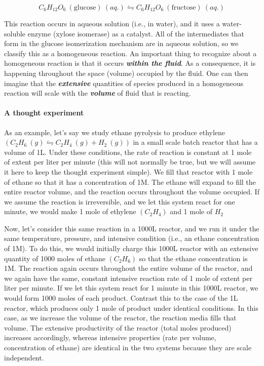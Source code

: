 \documentclass[11pt]{article}
\begin{document}
\[C_6H_{12}O_6 \ (\textrm{glucose}) \ (aq.) \leftrightharpoons C_6H_{12}O_6 \ (\textrm{fructose}) \ (aq.)\]

This reaction occurs in aqueous solution (i.e., in water), and it uses a
water-soluble enzyme (xylose isomerase) as a catalyst. All of the
intermediates that form in the glucose isomerization mechanism are in
aqueous solution, so we classify this as a homogeneous reaction. An
important thing to recognize about a homogeneous reaction is that it
occurs \textbf{\emph{within the fluid}}. As a consequence, it is
happening throughout the space (volume) occupied by the fluid. One can
then imagine that the \textbf{\emph{extensive}} quantities of species
produced in a homogeneous reaction will scale with the
\textbf{\emph{volume}} of fluid that is reacting.

\hypertarget{a-thought-experiment}{%
\paragraph{A thought experiment}\label{a-thought-experiment}}

As an example, let's say we study ethane pyrolysis to produce ethylene
\((C_2H_6 \ (g) \leftrightharpoons C_2H_4 \ (g) + H_2 \ (g))\) in a
small scale batch reactor that has a volume of 1L. Under these
conditions, the rate of reaction is constant at 1 mole of extent per
liter per minute (this will not normally be true, but we will assume it
here to keep the thought experiment simple). We fill that reactor with 1
mole of ethane so that it has a concentration of 1M. The ethane will
expand to fill the entire reactor volume, and the reaction occurs
throughout the volume occupied. If we assume the reaction is
irreversible, and we let this system react for one minute, we would make
1 mole of ethylene \((C_2H_4)\) and 1 mole of \(H_2\)

Now, let's consider this same reaction in a 1000L reactor, and we run it
under the same temperature, pressure, and intensive condition (i.e., an
ethane concentration of 1M). To do this, we would initially charge this
1000L reactor with an extensive quantity of 1000 moles of ethane
\((C_2H_6)\) so that the ethane concentration is 1M. The reaction again
occurs throughout the entire volume of the reactor, and we again have
the same, constant intensive reaction rate of 1 mole of extent per liter
per minute. If we let this system react for 1 minute in this 1000L
reactor, we would form 1000 moles of each product. Contrast this to the
case of the 1L reactor, which produces only 1 mole of product under
identical conditions. In this case, as we increase the volume of the
reactor, the reaction media fills that volume. The extensive
productivity of the reactor (total moles produced) increases
accordingly, whereas intensive properties (rate per volume,
concentration of ethane) are identical in the two systems because they
are scale independent.
\end{document}
